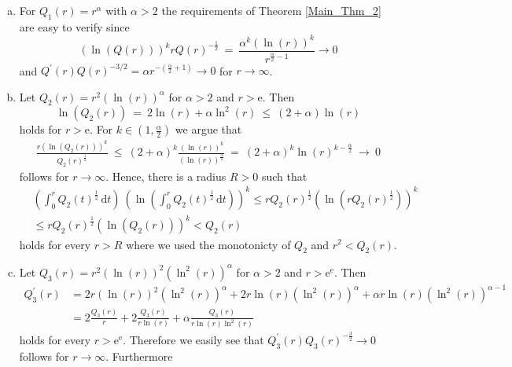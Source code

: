 \documentclass[12pt,longbibliography]{article}
\def\d{\,\mathrm{d}}
\theoremstyle{definition}
\theoremstyle{remark}
\theoremstyle{example}
\begin{document}
\begin{enumerate}[a)]

\item For $Q_{1}(r) = r^{\alpha}$ with $\alpha > 2$ the requirements of Theorem \ref{Main_Thm_2} are easy to verify since
$$
\left( \ln \left( Q(r) \right) \right)^{k} r Q(r)^{-\frac{1}{2}} \ = \ \frac{\alpha^{k} \left( \ln (r) \right)^{k}}{r^{\frac{\alpha}{2} - 1}} \to 0 
$$
and $Q^{\prime}(r)Q(r)^{-3/2} = \alpha r^{- ( \frac{\alpha}{2} + 1)} \to 0$ for $r \to \infty$.

\item Let $Q_{2}(r) = r^{2} \left( \ln(r) \right)^{\alpha}$ for $\alpha > 2$ and $r > \mathrm{e}$. Then 
$$
\ln \left( Q_{2}(r) \right) \ = \ 2 \ln(r) + \alpha \ln^{2} (r) \ \leq \ (2+\alpha) \ln(r) 
$$
holds for $r > \mathrm{e}$. For $k \in (1, \frac{\alpha}{2})$ we argue that
\begin{align*}
\frac{r \left( \ln \left( Q_{2}(r) \right) \right)^{k}}{Q_{2}(r)^{\frac{1}{2}}} \ \leq \ 
\left( 2 + \alpha \right)^{k} \frac{\left( \ln(r) \right)^{k}}{\left( \ln(r) \right)^{\frac{\alpha}{2}}} \ = \ 
\left( 2 + \alpha \right)^{k} \ln(r)^{k-\frac{\alpha}{2}} \ \to \ 0
\end{align*}
follows for $r \to \infty$. Hence, there is a radius $R>0$ such that
\begin{align*}
& \left( \int_{0}^{r} Q_{2}(t)^{\frac{1}{2}} \d t \right) \  \left( \ln \left(  \int_{0}^{r} Q_{2}(t)^{\frac{1}{2}} \d t  \right) \right)^{k}  
\leq r Q_{2}(r)^{\frac{1}{2}} \left( \ln \left( r Q_{2}(r)^{\frac{1}{2}} \right) \right)^{k} \\
& \leq r Q_{2}(r)^{\frac{1}{2}}  \left( \ln \left( Q_{2}(r) \right) \right)^{k} < Q_{2}(r)
\end{align*}
holds for every $r > R$ where we used the monotonicty of $Q_{2}$ and $r^{2} < Q_{2}(r)$. 

\item Let $Q_{3}(r) = r^{2} \left( \ln(r) \right)^{2} \left( \ln^{2}(r) \right)^{\alpha}$ for $\alpha > 2$ and $r > \mathrm{e}^{\mathrm{e}}$.
Then 
\begin{align*}
Q_{3}^{\prime}(r) & = 2 r \left( \ln(r) \right)^{2} \left( \ln^{2}(r) \right)^{\alpha} + 2 r \ln(r) \left( \ln^{2}(r) \right)^{\alpha} 
+ \alpha r \ln(r) \left( \ln^{2}(r) \right)^{\alpha-1} \\
& = 2 \frac{Q_{3}(r)}{r} + 2 \frac{Q_{3}(r)}{r\ln(r)} + \alpha \frac{Q_{3}(r)}{r\ln(r) \ln^{2}(r)}
\end{align*}
holds for every $r > \mathrm{e}^{\mathrm{e}}$. Therefore we easily see that $Q_{3}^{\prime}(r) Q_{3}(r)^{-\frac{3}{2}} \to 0$
follows for $r \to \infty$. Furthermore
\begin{enumerate}[1.)]


\end{enumerate}
\end{enumerate}
\end{document}
